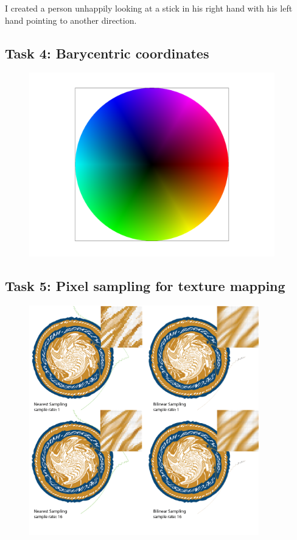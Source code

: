 \documentclass[11pt]{article}
\begin{document}
  I created a person unhappily looking at a stick in his right hand with his left hand
  pointing to another direction. 

\newpage
\subsection*{Task 4: Barycentric coordinates}
\begin{figure}[h]
    \centering
    \includegraphics[width=0.95\textwidth]{T4.png} %
  \end{figure}
\newpage
\subsection*{Task 5: Pixel sampling for texture mapping}
\begin{figure}[h]
    \centering
    \includegraphics[width=0.89\textwidth]{T5.png} %
  \end{figure}
\newpage
\end{document}
